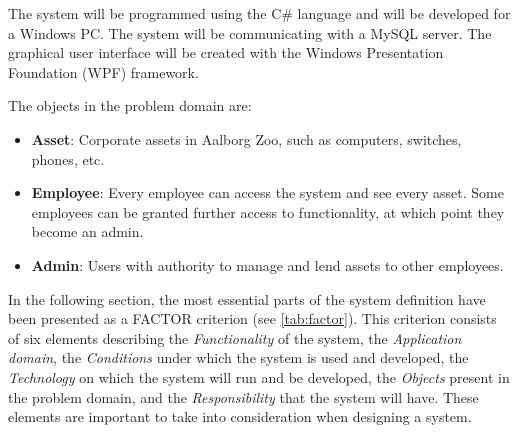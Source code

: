 \par
The system will be programmed using the C\# language and will be developed for a Windows PC. The system will be communicating with a MySQL server. The graphical user interface will be created with the Windows Presentation Foundation (WPF) framework.
\par
The objects in the problem domain are: 
\begin{itemize}
    \item \textbf{Asset}: Corporate assets in Aalborg Zoo, such as computers, switches, phones, etc.
    
    \item \textbf{Employee}: Every employee can access the system and see every asset. Some employees can be granted further access to functionality, at which point they become an admin.
    
    \item \textbf{Admin}: Users with authority to manage and lend assets to other employees.
\end{itemize}

In the following section, the most essential parts of the system definition have been presented as a FACTOR criterion \citep{OOAD} (see \autoref{tab:factor}). This criterion consists of six elements describing the \textit{Functionality} of the system, the \textit{Application domain}, the \textit{Conditions} under which the system is used and developed, the \textit{Technology} on which the system will run and be developed, the \textit{Objects} present in the problem domain, and the \textit{Responsibility} that the system will have. These elements are important to take into consideration when designing a system. 